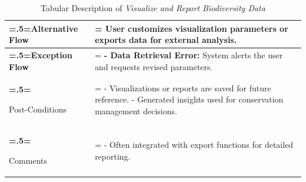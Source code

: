 \begin{table}[H]
\begin{tabularx}{\textwidth}{|>{\bfseries\hsize=.5\hsize\linewidth=\hsize}X|
                    >{\hsize=1.5\hsize\linewidth=\hsize}X|}
                    Alternative Flow    & 
                    User customizes visualization parameters or exports data for external analysis.  \\ \hline
                    
                    Exception Flow      & 
                    \textbf{- Data Retrieval Error:} System alerts the user and requests revised parameters.\\ \hline
                    
                    Post-Conditions     & 
                    - Visualizations or reports are saved for future reference.\newline
                    - Generated insights used for conservation management decisions. \\ \hline
                    
                    Comments            & 
                    - Often integrated with export functions for detailed reporting. \\ \hline
                    \end{tabularx}
                    \caption{Tabular Description of \textit{Visualize and Report Biodiversity Data} \label{Tab:UseCase3}}
                    \end{table}
